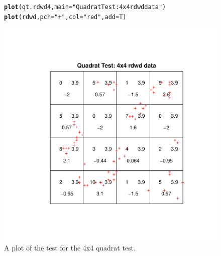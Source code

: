 \documentclass{article}\usepackage[]{graphicx}\usepackage[]{color}
\makeatletter
\def\maxwidth{ %
  \ifdim\Gin@nat@width>\linewidth
    \linewidth
  \else
    \Gin@nat@width
  \fi
}
\newcommand{\hlstr}[1]{\textcolor[rgb]{0.192,0.494,0.8}{#1}}%
\newcommand{\hlstd}[1]{\textcolor[rgb]{0.345,0.345,0.345}{#1}}%
\newcommand{\hlkwc}[1]{\textcolor[rgb]{0.333,0.667,0.333}{#1}}%
\newcommand{\hlkwd}[1]{\textcolor[rgb]{0.737,0.353,0.396}{\textbf{#1}}}%
\newenvironment{kframe}{%
 \def\at@end@of@kframe{}%
 \ifinner\ifhmode%
  \def\at@end@of@kframe{\end{minipage}}%
  \begin{minipage}{\columnwidth}%
 \fi\fi%
 \def\FrameCommand##1{\hskip\@totalleftmargin \hskip-\fboxsep
 \colorbox{shadecolor}{##1}\hskip-\fboxsep
     \hskip-\linewidth \hskip-\@totalleftmargin \hskip\columnwidth}%
 \MakeFramed {\advance\hsize-\width
   \@totalleftmargin\z@ \linewidth\hsize
   \@setminipage}}%
 {\par\unskip\endMakeFramed%
 \at@end@of@kframe}
\newenvironment{knitrout}{}{} %
\makeatother
\begin{document}
\begin{figure}
\begin{knitrout}
\color{fgcolor}\begin{kframe}
\begin{alltt}
\hlkwd{plot}\hlstd{(qt.rdwd4,} \hlkwc{main}\hlstd{=}\hlstr{"Quadrat Test: 4x4 rdwd data"}\hlstd{)}
\hlkwd{plot}\hlstd{(rdwd,} \hlkwc{pch}\hlstd{=}\hlstr{"+"}\hlstd{,} \hlkwc{col}\hlstd{=}\hlstr{"red"}\hlstd{,} \hlkwc{add}\hlstd{=T)}
\end{alltt}
\end{kframe}
\includegraphics[width=\maxwidth]{figure/plottests4x4} 

\end{knitrout}
\caption{A plot of the test for the 4x4 quadrat test.}
\label{qt.rdwd4}
\end{figure}
\FloatBarrier
\end{document}
